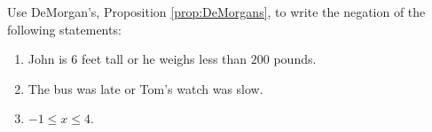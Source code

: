 \guard



\begin{exercise}
  Use DeMorgan's, Proposition \ref{prop:DeMorgans}, to write the negation of the following statements:
  \begin{enumerate}
    \item John is $6$ feet tall or he weighs less than $200$ pounds.
    \item The bus was late or Tom's watch was slow.
    \item $-1\leq x\leq 4$.
  \end{enumerate}
\end{exercise}
